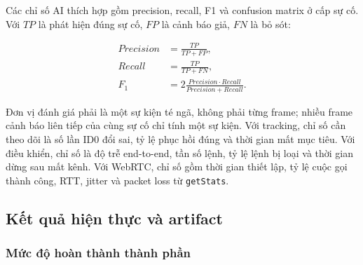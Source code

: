 Các chỉ số AI thích hợp gồm precision, recall, F1 và confusion matrix ở cấp sự cố. Với $TP$ là phát hiện đúng sự cố, $FP$ là cảnh báo giả, $FN$ là bỏ sót:

\begin{align}
Precision &= \frac{TP}{TP+FP},\\
Recall &= \frac{TP}{TP+FN},\\
F_1 &= 2\frac{Precision\cdot Recall}{Precision+Recall}.
\end{align}

Đơn vị đánh giá phải là một sự kiện té ngã, không phải từng frame; nhiều frame cảnh báo liên tiếp của cùng sự cố chỉ tính một sự kiện. Với tracking, chỉ số cần theo dõi là số lần ID0 đổi sai, tỷ lệ phục hồi đúng và thời gian mất mục tiêu. Với điều khiển, chỉ số là độ trễ end-to-end, tần số lệnh, tỷ lệ lệnh bị loại và thời gian dừng sau mất kênh. Với WebRTC, chỉ số gồm thời gian thiết lập, tỷ lệ cuộc gọi thành công, RTT, jitter và packet loss từ \texttt{getStats}.

\subsection{Kết quả hiện thực và artifact}

\subsubsection{Mức độ hoàn thành thành phần}

